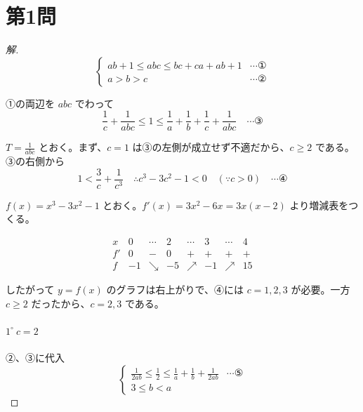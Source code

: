 \documentclass[../main.tex]{subfiles}
\begin{document}
\section*{第1問}

\begin{proof}[解]
  \begin{equation}
    \begin{cases}
      ab+1 \le abc \le bc+ca+ab+1 & \cdots \text{①} \\
      a > b > c & \cdots \text{②}
    \end{cases}
  \end{equation}

  ①の両辺を $abc$ でわって
  \begin{equation}
    \frac{1}{c} + \frac{1}{abc} \le 1 \le \frac{1}{a} + \frac{1}{b} + \frac{1}{c} + \frac{1}{abc} \quad \cdots \text{③}
  \end{equation}

  $T = \frac{1}{abc}$ とおく。まず、$c=1$ は③の左側が成立せず不適だから、$c \ge 2$ である。③の右側から
  \begin{equation}
    1 < \frac{3}{c} + \frac{1}{c^3} \quad \therefore c^3 - 3c^2 - 1 < 0 \quad (\because c > 0) \quad \cdots \text{④}
  \end{equation}

  $f(x) = x^3 - 3x^2 - 1$ とおく。$f'(x) = 3x^2 - 6x = 3x(x-2)$ より増減表をつくる。

  \[
    \begin{array}{c|c|c|c|c|c|c|c}
      x & 0 & \cdots & 2 & \cdots & 3 & \cdots & 4 \\ \hline
      f' & 0 & - & 0 & + & + & + & + \\ \hline
      f & -1 & \searrow & -5 & \nearrow & -1 & \nearrow & 15
    \end{array}
  \]

  したがって $y=f(x)$ のグラフは右上がりで、④には $c=1, 2, 3$ が必要。一方 $c \ge 2$ だったから、$c=2, 3$ である。

  \paragraph{$1^\circ \ c=2$}
  ②、③に代入
  \begin{equation}
    \begin{cases}
      \frac{1}{2ab} \le \frac{1}{2} \le \frac{1}{a} + \frac{1}{b} + \frac{1}{2ab} & \cdots \text{⑤} \\
      3 \le b < a
    \end{cases}
  \end{equation}


\end{proof}
\end{document}
